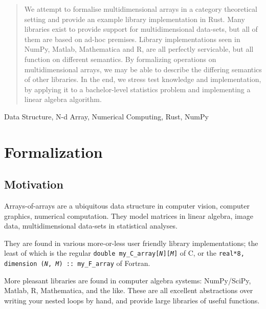 \documentclass{DIKU-report-variant}
\begin{document}
\maketitle

\begin{abstract}
  We attempt to formalise multidimensional arrays in a category theoretical
  setting and provide an example library implementation in Rust.
  Many libraries exist to provide support for multidimensional data-sets, but all
  of them are based on ad-hoc premises.
  Library implementations seen in NumPy, Matlab, Mathematica and R, are all
  perfectly servicable, but all function on different semantics.
  By formalizing operations on multidimensional arrays, we may be able to
  describe the differing semantics of other libraries.
  In the end, we stress test knowledge and implementation, by applying it to
  a bachelor-level statistics problem and implementing a linear algebra algorithm.
\end{abstract}

\begin{keywords}
  Data Structure, N-d Array, Numerical Computing, Rust, NumPy
\end{keywords}

\setcounter{tocdepth}{2}
\tableofcontents

\chapter{Formalization}

\section{Motivation}

Arrays-of-arrays are a ubiquitous data structure in computer vision,
computer graphics, numerical computation. They model matrices in linear algebra,
image data, multidimensional data-sets in statistical analyses.

They are found in various more-or-less user friendly library implementations;
the least of which is the regular \texttt{double my\_C\_array[\textit{N}][\textit{M}]} of
C, or the \texttt{real*8, dimension (\textit{N}, \textit{M}) :: my\_F\_array} of Fortran.

More pleasant libraries are found in computer algebra systems: NumPy/SciPy, Matlab,
R, Mathematica, and the like. These are all excellent abstractions over
writing your nested loops by hand, and provide large libraries of useful functions.
\end{document}
